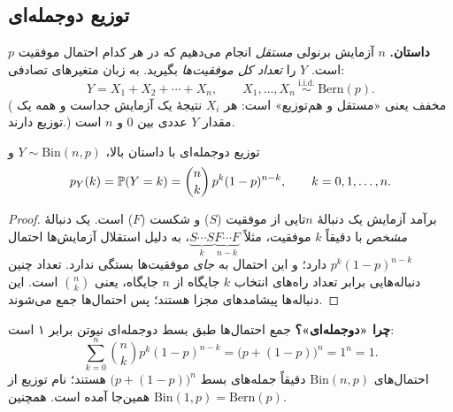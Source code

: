 \subsection{توزیع دوجمله‌ای}

\textbf{داستان.} $n$ آزمایش برنولی \emph{مستقل} انجام می‌دهیم که در هر کدام احتمال موفقیت $p$ است. $Y$ را \emph{تعداد کل موفقیت‌ها} بگیرید. به زبان متغیرهای تصادفی:
\[ Y=X_1+X_2+\cdots+X_n,\qquad X_1,\dots,X_n\ \overset{\text{i.i.d.}}{\sim}\ \mathrm{Bern}(p). \]
( مخفف  یعنی «مستقل و هم‌توزیع» است: هر $X_i$ نتیجهٔ یک آزمایش جداست و همه یک توزیع دارند.)
مقدار $Y$ عددی بین $0$ و $n$ است.

\begin{theorem}[label=thm:binom]{توزیع دوجمله‌ای}
با داستان بالا، $Y\sim\mathrm{Bin}(n,p)$ و
\[ p_Y(k)=\P(Y=k)=\binom nk\,p^k(1-p)^{n-k},\qquad k=0,1,\dots,n. \]
\end{theorem}

\begin{proof}
برآمد آزمایش یک دنبالهٔ $n$تایی از موفقیت ($S$) و شکست ($F$) است. یک دنبالهٔ \emph{مشخص} با دقیقاً $k$ موفقیت، مثلاً $\underbrace{S\cdots S}_{k}\underbrace{F\cdots F}_{n-k}$، به دلیل استقلال آزمایش‌ها احتمال $p^k(1-p)^{n-k}$ دارد؛ و این احتمال به \emph{جای} موفقیت‌ها بستگی ندارد. تعداد چنین دنباله‌هایی برابر تعداد راه‌های انتخاب $k$ جایگاه از $n$ جایگاه، یعنی $\binom nk$ است. این دنباله‌ها پیشامدهای مجزا هستند؛ پس احتمال‌ها جمع می‌شوند.
\end{proof}

\begin{note}
\textbf{چرا «دوجمله‌ای»؟} جمع احتمال‌ها طبق بسط دوجمله‌ای نیوتن برابر ۱ است:
\[ \sum_{k=0}^{n}\binom nk p^k(1-p)^{n-k}=\bigl(p+(1-p)\bigr)^n=1^n=1. \]
احتمال‌های $\mathrm{Bin}(n,p)$ دقیقاً جمله‌های بسط $\bigl(p+(1-p)\bigr)^n$ هستند؛ نام توزیع از همین‌جا آمده است. همچنین $\mathrm{Bin}(1,p)=\mathrm{Bern}(p)$.
\end{note}


